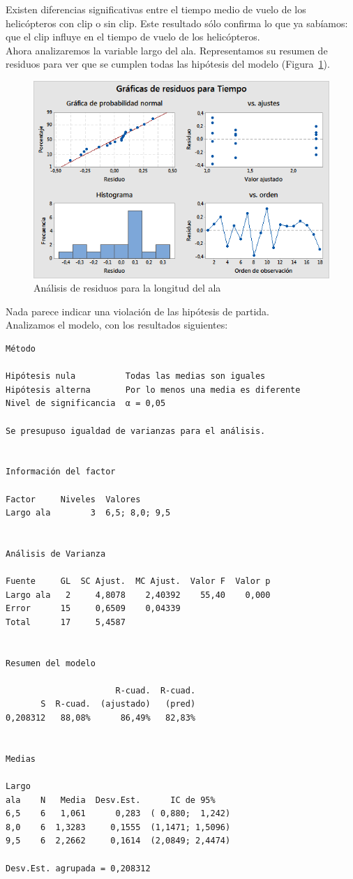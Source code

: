 \documentclass[12pt,a4paper,twoside,openright,titlepage,final]{article}
\begin{document}
Existen diferencias significativas entre el tiempo medio de vuelo de los helicópteros con clip o sin clip. Este resultado sólo confirma lo que ya sabíamos: que el clip influye en el tiempo de vuelo de los helicópteros.\\

Ahora analizaremos la variable largo del ala. Representamos su resumen de residuos para ver que se cumplen todas las hipótesis del modelo (Figura~\ref{fig:residuos_largo_ala}).\\

\begin{figure}[htbp!]
	\centering
	\includegraphics[width=0.7\linewidth]{imagenes/Graficas_de_residuos_para_Tiempo_(ANOVA_largo_ala)}
	\caption{Análisis de residuos para la longitud del ala}
	\label{fig:residuos_largo_ala}
\end{figure}

Nada parece indicar una violación de las hipótesis de partida.\\

Analizamos el modelo, con los resultados siguientes:

\begin{verbatim}
Método

Hipótesis nula          Todas las medias son iguales
Hipótesis alterna       Por lo menos una media es diferente
Nivel de significancia  α = 0,05

Se presupuso igualdad de varianzas para el análisis.


Información del factor

Factor     Niveles  Valores
Largo ala        3  6,5; 8,0; 9,5


Análisis de Varianza

Fuente     GL  SC Ajust.  MC Ajust.  Valor F  Valor p
Largo ala   2     4,8078    2,40392    55,40    0,000
Error      15     0,6509    0,04339
Total      17     5,4587


Resumen del modelo

                      R-cuad.  R-cuad.
       S  R-cuad.  (ajustado)   (pred)
0,208312   88,08%      86,49%   82,83%


Medias

Largo
ala    N   Media  Desv.Est.      IC de 95%
6,5    6   1,061      0,283  ( 0,880;  1,242)
8,0    6  1,3283     0,1555  (1,1471; 1,5096)
9,5    6  2,2662     0,1614  (2,0849; 2,4474)

Desv.Est. agrupada = 0,208312
\end{verbatim}
\end{document}
